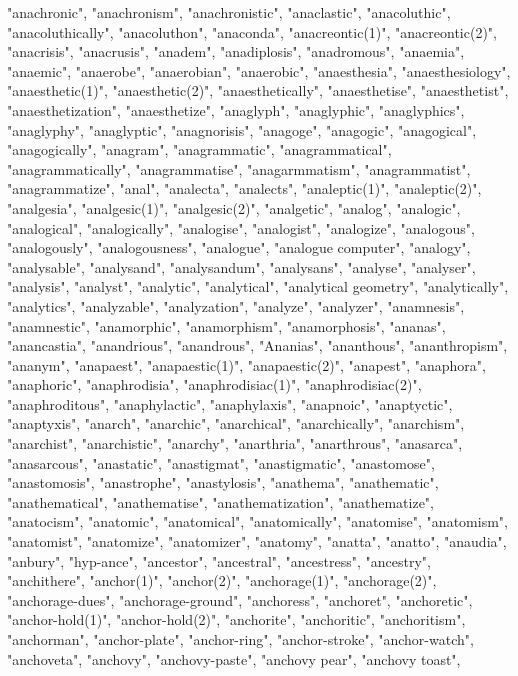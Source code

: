 "anachronic",
"anachronism",
"anachronistic",
"anaclastic",
"anacoluthic",
"anacoluthically",
"anacoluthon",
"anaconda",
"anacreontic(1)",
"anacreontic(2)",
"anacrisis",
"anacrusis",
"anadem",
"anadiplosis",
"anadromous",
"anaemia",
"anaemic",
"anaerobe",
"anaerobian",
"anaerobic",
"anaesthesia",
"anaesthesiology",
"anaesthetic(1)",
"anaesthetic(2)",
"anaesthetically",
"anaesthetise",
"anaesthetist",
"anaesthetization",
"anaesthetize",
"anaglyph",
"anaglyphic",
"anaglyphics",
"anaglyphy",
"anaglyptic",
"anagnorisis",
"anagoge",
"anagogic",
"anagogical",
"anagogically",
"anagram",
"anagrammatic",
"anagrammatical",
"anagrammatically",
"anagrammatise",
"anagarmmatism",
"anagrammatist",
"anagrammatize",
"anal",
"analecta",
"analects",
"analeptic(1)",
"analeptic(2)",
"analgesia",
"analgesic(1)",
"analgesic(2)",
"analgetic",
"analog",
"analogic",
"analogical",
"analogically",
"analogise",
"analogist",
"analogize",
"analogous",
"analogously",
"analogousness",
"analogue",
"analogue computer",
"analogy",
"analysable",
"analysand",
"analysandum",
"analysans",
"analyse",
"analyser",
"analysis",
"analyst",
"analytic",
"analytical",
"analytical geometry",
"analytically",
"analytics",
"analyzable",
"analyzation",
"analyze",
"analyzer",
"anamnesis",
"anamnestic",
"anamorphic",
"anamorphism",
"anamorphosis",
"ananas",
"anancastia",
"anandrious",
"anandrous",
"Ananias",
"ananthous",
"ananthropism",
"ananym",
"anapaest",
"anapaestic(1)",
"anapaestic(2)",
"anapest",
"anaphora",
"anaphoric",
"anaphrodisia",
"anaphrodisiac(1)",
"anaphrodisiac(2)",
"anaphroditous",
"anaphylactic",
"anaphylaxis",
"anapnoic",
"anaptyctic",
"anaptyxis",
"anarch",
"anarchic",
"anarchical",
"anarchically",
"anarchism",
"anarchist",
"anarchistic",
"anarchy",
"anarthria",
"anarthrous",
"anasarca",
"anasarcous",
"anastatic",
"anastigmat",
"anastigmatic",
"anastomose",
"anastomosis",
"anastrophe",
"anastylosis",
"anathema",
"anathematic",
"anathematical",
"anathematise",
"anathematization",
"anathematize",
"anatocism",
"anatomic",
"anatomical",
"anatomically",
"anatomise",
"anatomism",
"anatomist",
"anatomize",
"anatomizer",
"anatomy",
"anatta",
"anatto",
"anaudia",
"anbury",
"hyp-ance",
"ancestor",
"ancestral",
"ancestress",
"ancestry",
"anchithere",
"anchor(1)",
"anchor(2)",
"anchorage(1)",
"anchorage(2)",
"anchorage-dues",
"anchorage-ground",
"anchoress",
"anchoret",
"anchoretic",
"anchor-hold(1)",
"anchor-hold(2)",
"anchorite",
"anchoritic",
"anchoritism",
"anchorman",
"anchor-plate",
"anchor-ring",
"anchor-stroke",
"anchor-watch",
"anchoveta",
"anchovy",
"anchovy-paste",
"anchovy pear",
"anchovy toast",
